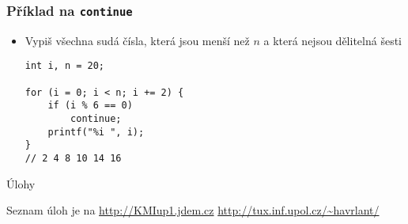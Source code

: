 \documentclass{beamer}
\newenvironment{itemizex}%
  {\large \begin{itemize}%
    \setlength{\itemsep}{8pt}%
    \setlength{\parskip}{8pt}}%
  {\end{itemize}}
\begin{document}
\begin{frame}[t,fragile]\frametitle{Příklad na \texttt{continue}} 
\begin{itemizex}
  \item Vypiš všechna sudá čísla, která jsou menší než $n$ a která nejsou dělitelná šesti
\begin{verbatim} 
int i, n = 20;

for (i = 0; i < n; i += 2) {
    if (i % 6 == 0)
        continue;
    printf("%i ", i);
}
// 2 4 8 10 14 16 
\end{verbatim}
\end{itemizex}
\end{frame}

\begin{frame}[t,fragile]{Úlohy}
\begin{center}
\vskip 1cm
{\Large Seznam úloh je na \url{http://KMIup1.jdem.cz}}
\vskip 2cm
\url{http://tux.inf.upol.cz/~havrlant/}
\end{center}
\end{frame}
\end{document}
